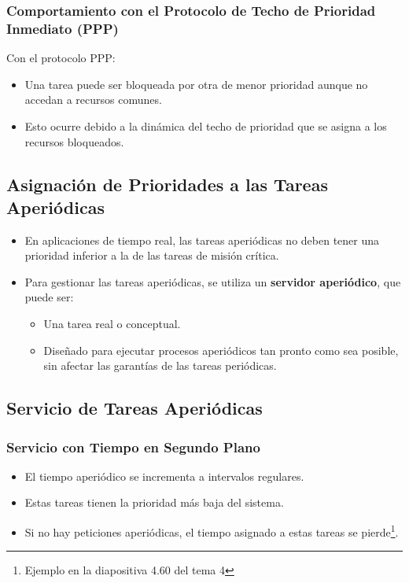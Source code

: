 \documentclass[a4paper,12pt]{article}
\begin{document}
\subsubsection{Comportamiento con el Protocolo de Techo de Prioridad Inmediato (PPP)}
Con el protocolo PPP:
\begin{itemize}
    \item Una tarea puede ser bloqueada por otra de menor prioridad aunque no accedan a recursos comunes.
    \item Esto ocurre debido a la dinámica del techo de prioridad que se asigna a los recursos bloqueados.
\end{itemize}

\subsection{Asignación de Prioridades a las Tareas Aperiódicas}

\begin{itemize}
    \item En aplicaciones de tiempo real, las tareas aperiódicas no deben tener una prioridad inferior a la de las tareas de misión crítica.
    \item Para gestionar las tareas aperiódicas, se utiliza un \textbf{servidor aperiódico}, que puede ser:
    \begin{itemize}
        \item Una tarea real o conceptual.
        \item Diseñado para ejecutar procesos aperiódicos tan pronto como sea posible, sin afectar las garantías de las tareas periódicas.
    \end{itemize}
\end{itemize}

\subsection{Servicio de Tareas Aperiódicas}

\subsubsection{Servicio con Tiempo en Segundo Plano}
\begin{itemize}
    \item El tiempo aperiódico se incrementa a intervalos regulares.
    \item Estas tareas tienen la prioridad más baja del sistema.
    \item Si no hay peticiones aperiódicas, el tiempo asignado a estas tareas se pierde\footnote{Ejemplo en la diapositiva 4.60 del tema 4}.
\end{itemize}
\end{document}
